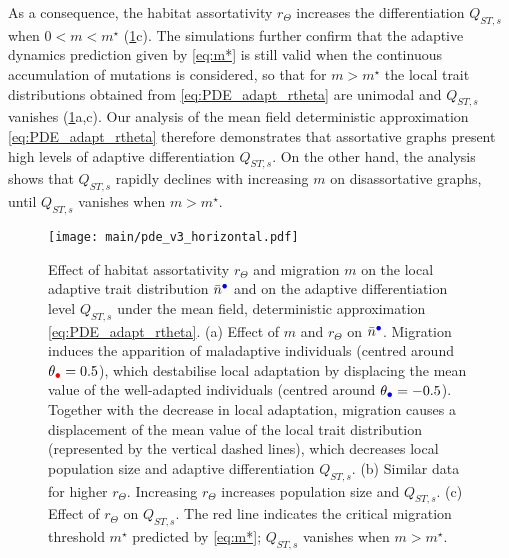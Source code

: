   As a consequence, the habitat assortativity $r_\Theta$ increases the differentiation $Q_{ST,s}$ when $ 0 < m < m^\star$ (\cref{fig:heatmap_betas_m_rtheta}c). The simulations further confirm that the adaptive dynamics prediction given by \cref{eq:m*} is still valid when the continuous accumulation of mutations is considered, so that for $m > m^\star$ the local trait distributions obtained from \cref{eq:PDE_adapt_rtheta} are unimodal and $Q_{ST,s}$ vanishes (\cref{fig:heatmap_betas_m_rtheta}a,c). Our analysis of the mean field deterministic approximation \cref{eq:PDE_adapt_rtheta} therefore demonstrates that assortative graphs present high levels of adaptive differentiation $Q_{ST,s}$. On the other hand, the analysis shows that $Q_{ST,s}$ rapidly declines with increasing $m$ on disassortative graphs, until $Q_{ST,s}$ vanishes when $m > m^\star$.
  
  \begin{figure}[ht]
	\centering
	\texttt{[image: main/pde\_v3\_horizontal.pdf]}
	  \caption{\small Effect of habitat assortativity $r_\Theta$ and migration $m$ on the local adaptive trait distribution $\bar{n}^{\bcirc}$ and on the adaptive differentiation level $Q_{ST,s}$ under the mean field, deterministic approximation \cref{eq:PDE_adapt_rtheta}. (a) Effect of $m$ and $r_\Theta$ on $\bar{n}^{\bcirc}$. Migration induces the apparition of maladaptive individuals (centred around $\theta_{\rcirc} = 0.5$), which destabilise local adaptation by displacing the mean value of the well-adapted individuals (centred around $\theta_{\bcirc} = -0.5$). Together with the decrease in local adaptation, migration causes a displacement of the mean value of the local trait distribution (represented by the vertical dashed lines), which decreases local population size and adaptive differentiation $Q_{ST,s}$. (b) Similar data for higher $r_\Theta$. Increasing $r_\Theta$ increases population size and $Q_{ST,s}$. (c) Effect of $r_\Theta$ on $Q_{ST,s}$. The red line indicates the critical migration threshold $m^\star$ predicted by \cref{eq:m*}; $Q_{ST,s}$ vanishes when $m > m^\star$.}\label{fig:heatmap_betas_m_rtheta}
  \end{figure}
  
